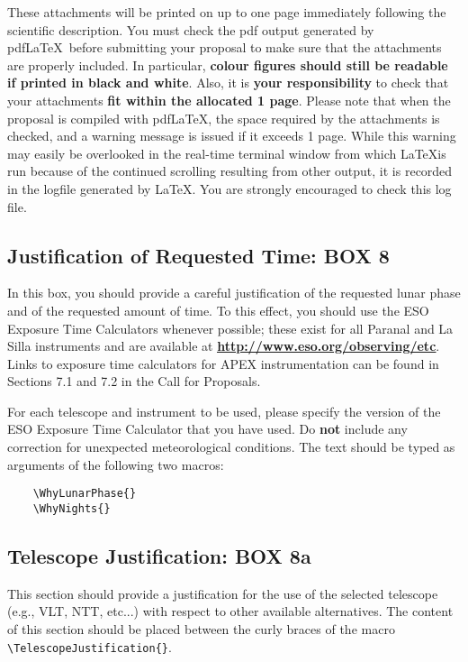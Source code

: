 \documentclass{article}
\begin{document}
These attachments will be printed on up to one page
immediately following the scientific description. You must check the
pdf output generated by pdf\LaTeX\ before submitting your proposal to
make sure that the attachments are properly included. In particular,
{\bf colour figures should still be readable if printed in  
black and white}. Also,
it is {\bf your responsibility} to check that your attachments 
{\bf fit within the allocated 1 page}. Please note that
when the proposal is compiled with pdf\LaTeX, the space required by
the attachments is checked, and a warning message is issued if it 
exceeds 1 page. While this warning may easily be overlooked in the
real-time terminal window from which \LaTeX is run because of the
continued scrolling resulting from other output, it is recorded in the
logfile generated by LaTeX. You are strongly encouraged to check
this log file.

\subsection{Justification of Requested Time: {\bf BOX 8}}

In this box, you should provide a careful justification of the
requested lunar phase and of the requested amount of time. To 
this effect, you should use the ESO Exposure
Time Calculators whenever possible; these exist for all Paranal and La Silla
instruments and are available at
\href{http://www.eso.org/observing/etc}{\bf
  \underline{http://www.eso.org/observing/etc}}. 
  Links to exposure time calculators for APEX instrumentation
  can be found in Sections 7.1 and 7.2 in the Call for Proposals.

For each telescope and instrument to be used, please specify the
version of the ESO Exposure Time Calculator that you have
used.  Do {\bf not} include any correction for unexpected
meteorological conditions. The text should be typed as arguments of
the following two macros:
\begin{verbatim}
    \WhyLunarPhase{}
    \WhyNights{}
\end{verbatim} 

\subsection{Telescope Justification: {\bf BOX 8a}}
This section should provide a justification for the use of the
selected telescope (e.g., VLT, NTT, etc...)  with respect to other
available alternatives.  The content of this section should be placed
between the curly braces of the macro \verb|\TelescopeJustification{}|.
\end{document}
